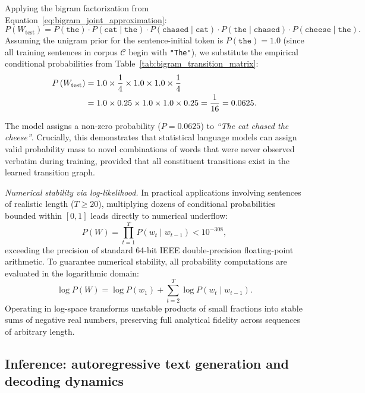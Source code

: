 \documentclass[../../main.tex]{subfiles}
\begin{document}
Applying the bigram factorization from Equation~\eqref{eq:bigram_joint_approximation}:
\begin{equation}
P\left(W_{\text{test}}\right) = P\left(\texttt{the}\right) \cdot P\left(\texttt{cat} \mid \texttt{the}\right) \cdot P\left(\texttt{chased} \mid \texttt{cat}\right) \cdot P\left(\texttt{the} \mid \texttt{chased}\right) \cdot P\left(\texttt{cheese} \mid \texttt{the}\right).
\end{equation}
Assuming the unigram prior for the sentence-initial token is $P(\texttt{the}) = 1.0$ (since all training sentences in corpus $\mathcal{C}$ begin with \texttt{"The"}), we substitute the empirical conditional probabilities from Table~\ref{tab:bigram_transition_matrix}:
\begin{align}
P\left(W_{\text{test}}\right) &= 1.0 \times \frac{1}{4} \times 1.0 \times 1.0 \times \frac{1}{4} \notag \\
&= 1.0 \times 0.25 \times 1.0 \times 1.0 \times 0.25 = \frac{1}{16} = 0.0625.
\end{align}

The model assigns a non-zero probability ($P = 0.0625$) to \textit{``The cat chased the cheese''}. Crucially, this demonstrates that statistical language models can assign valid probability mass to novel combinations of words that were never observed verbatim during training, provided that all constituent transitions exist in the learned transition graph.

\textit{Numerical stability via log-likelihood.} In practical applications involving sentences of realistic length ($T \ge 20$), multiplying dozens of conditional probabilities bounded within $[0, 1]$ leads directly to numerical underflow:
\begin{equation}
P(W) = \prod_{t=1}^T P\left(w_t \mid w_{t-1}\right) < 10^{-308},
\end{equation}
exceeding the precision of standard 64-bit IEEE double-precision floating-point arithmetic. To guarantee numerical stability, all probability computations are evaluated in the logarithmic domain:
\begin{equation}
\log P(W) = \log P\left(w_1\right) + \sum_{t=2}^T \log P\left(w_t \mid w_{t-1}\right).
\label{eq:log_likelihood_sum}
\end{equation}
Operating in log-space transforms unstable products of small fractions into stable sums of negative real numbers, preserving full analytical fidelity across sequences of arbitrary length.

\subsection{Inference: autoregressive text generation and decoding dynamics}
\label{subsec:autoregressive_generation_dynamics}
\end{document}
